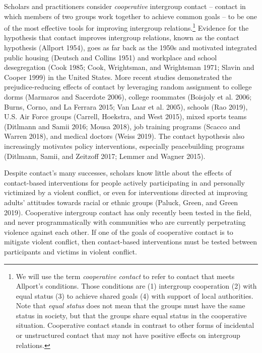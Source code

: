 \documentclass[11pt]{article}
\begin{document}
Scholars and practitioners consider \emph{cooperative} intergroup
contact -- contact in which members of two groups work together to
achieve common goals -- to be one of the most effective tools for
improving intergroup relations.\footnote{We will use the term
  \emph{cooperative contact} to refer to contact that meets Allport's
  conditions. Those conditions are (1) intergroup cooperation (2) with
  equal status (3) to achieve shared goals (4) with support of local
  authorities. Note that \emph{equal status} does not mean that the
  groups must have the same status in society, but that the groups share
  equal status in the cooperative situation. Cooperative contact stands
  in contrast to other forms of incidental or unstructured contact that
  may not have positive effects on intergroup relations.} Evidence for
the hypothesis that contact improves intergroup relations, known as the
contact hypothesis (Allport 1954), goes as far back as the 1950s and
motivated integrated public housing (Deutsch and Collins 1951) and
workplace and school desegregation (Cook 1985; Cook, Wrightsman, and
Wrightsman 1971; Slavin and Cooper 1999) in the United States. More
recent studies demonstrated the prejudice-reducing effects of contact by
leveraging random assignment to college dorms (Marmaros and Sacerdote
2006), college roommates (Boisjoly et al. 2006; Burns, Corno, and La
Ferrara 2015; Van Laar et al. 2005), schools (Rao 2019), U.S. Air Force
groups (Carrell, Hoekstra, and West 2015), mixed sports teams (Ditlmann
and Samii 2016; Mousa 2018), job training programs (Scacco and Warren
2018), and medical doctors (Weiss 2019). The contact hypothesis also
increasingly motivates policy interventions, especially peacebuilding
programs (Ditlmann, Samii, and Zeitzoff 2017; Lemmer and Wagner 2015).

Despite contact's many successes, scholars know little about the effects
of contact-based interventions for people actively participating in and
personally victimized by a violent conflict, or even for interventions
directed at improving adults' attitudes towards racial or ethnic groups
(Paluck, Green, and Green 2019). Cooperative intergroup contact has only
recently been tested in the field, and never programmatically with
communities who are currently perpetrating violence against each other.
If one of the goals of cooperative contact is to mitigate violent
conflict, then contact-based interventions must be tested between
participants and victims in violent conflict.
\end{document}
